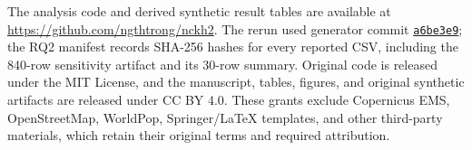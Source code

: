 \documentclass[runningheads]{llncs}
\begin{document}
The analysis code and derived synthetic result tables are available at
\url{https://github.com/ngthtrong/nckh2}. The rerun used generator commit
\href{https://github.com/ngthtrong/nckh2/commit/a6be3e988dad1aa442c8c8e158c2bba96b2b7fb9}{\texttt{a6be3e9}};
the RQ2 manifest records
SHA-256 hashes for every reported CSV, including the 840-row sensitivity
artifact and its 30-row summary. Original code is released under the MIT
License, and the manuscript, tables, figures, and original synthetic
artifacts are released under CC BY 4.0. These grants exclude Copernicus EMS,
OpenStreetMap, WorldPop, Springer/LaTeX templates, and other third-party
materials, which retain their original terms and required attribution.



\end{document}
